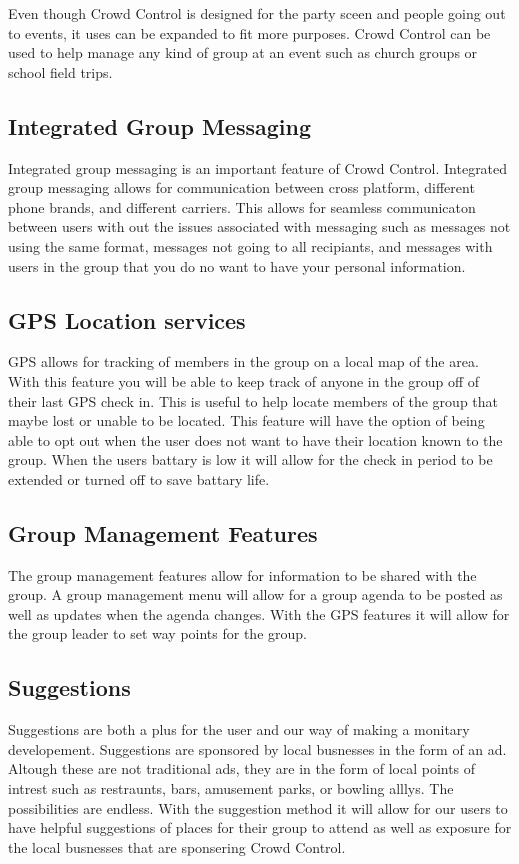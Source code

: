 Even though Crowd Control is designed for the party sceen and people going out to events, it uses can be expanded to fit more purposes. Crowd Control can be used to help manage any kind of group at an event such as church groups or school field trips.


\subsection{Integrated Group Messaging}
Integrated group messaging is an important feature of Crowd Control. Integrated group messaging allows for communication between cross platform, different phone brands, and different carriers. This allows for seamless communicaton between users with out the issues associated with messaging such as messages not using the same format, messages not going to all recipiants, and messages with users in the group that you do no want to have your personal information.

\subsection{GPS Location services}
GPS allows for tracking of members in the group on a local map of the area. With this feature you will be able to keep track of anyone in the group off of their last GPS check in. This is useful to help locate members of the group that maybe lost or unable to be located. This feature will have the option of being able to opt out when the user does not want to have their location known to the group. When the users battary is low it will allow for the check in period to be extended or turned off to save battary life.

\subsection{Group Management Features}
The group management features allow for information to be shared with the group. A group management menu will allow for a group agenda to be posted as well as updates when the agenda changes. With the GPS features it will allow for the group leader to set way points for the group.  

\subsection{Suggestions}
Suggestions are both a plus for the user and our way of making a monitary developement. Suggestions are sponsored by local busnesses in the form of an ad. Altough these are not traditional ads, they are in the form of local points of intrest such as restraunts, bars, amusement parks, or bowling alllys. The possibilities are endless. With the suggestion method it will allow for our users to have helpful suggestions of places for their group to attend as well as exposure for the local busnesses that are sponsering Crowd Control.


